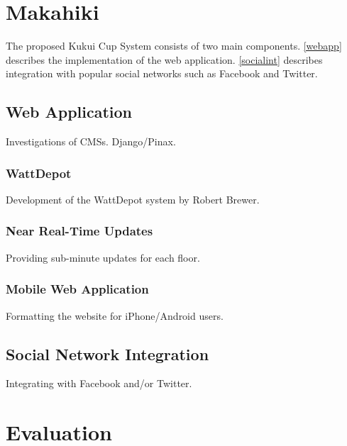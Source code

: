 \chapter{Makahiki}
\label{makahiki}

The proposed Kukui Cup System consists of two main components.  \autoref{webapp} describes the implementation of the web application.  \autoref{socialint} describes integration with popular social networks such as Facebook and Twitter.

\section{Web Application}
\label{webapp}

Investigations of CMSs.  Django/Pinax.

\subsection{WattDepot}

Development of the WattDepot system by Robert Brewer.

\subsection{Near Real-Time Updates}

Providing sub-minute updates for each floor.

\subsection{Mobile Web Application}

Formatting the website for iPhone/Android users.

\section{Social Network Integration}
\label{socialint}

Integrating with Facebook and/or Twitter.


\chapter{Evaluation}

